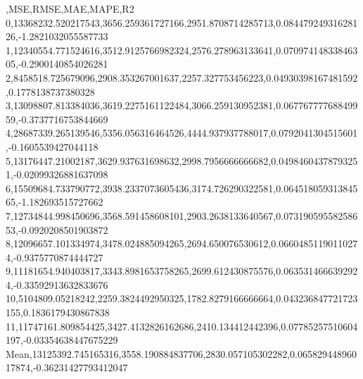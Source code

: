 ,MSE,RMSE,MAE,MAPE,R2
0,13368232.520217543,3656.259361727166,2951.8708714285713,0.08447924931628126,-1.2821032055587733
1,12340554.771524616,3512.9125766982324,2576.278963133641,0.07097414833846305,-0.2900140854026281
2,8458518.725679096,2908.353267001637,2257.327753456223,0.04930398167481592,0.1778138737380328
3,13098807.813384036,3619.2275161122484,3066.259130952381,0.06776777768849959,-0.3737716753844669
4,28687339.265139546,5356.056316464526,4444.937937788017,0.0792041304515601,-0.1605539427044118
5,13176447.21002187,3629.937631698632,2998.7956666666682,0.04984604378793251,-0.02099326881637098
6,15509684.733790772,3938.2337073605436,3174.726290322581,0.06451805931384565,-1.182693515727662
7,12734844.998450696,3568.591458608101,2903.2638133640567,0.07319059558258653,-0.0920208501903872
8,12096657.101334974,3478.024885094265,2694.650076530612,0.06604851190110274,-0.9375770874444727
9,11181654.940403817,3343.8981653758265,2699.612430875576,0.0635314666392924,-0.33592913632833676
10,5104809.05218242,2259.3824492950325,1782.8279166666664,0.043236847721723155,0.1836179430867838
11,11747161.809854425,3427.4132826162686,2410.134412442396,0.07785257510604197,-0.03354638447675229
Mean,13125392.745165316,3558.190884837706,2830.057105302282,0.06582944896017874,-0.36231427793412047
